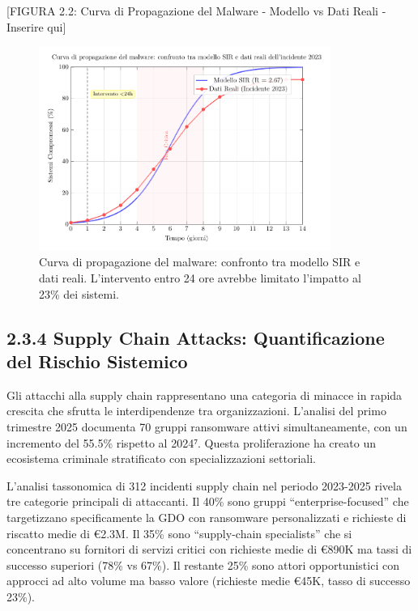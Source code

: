 \documentclass[12pt,a4paper,oneside]{book}
\numberwithin{figure}{chapter} %
\numberwithin{table}{chapter}  %
\begin{document}
{[}FIGURA 2.2: Curva di Propagazione del Malware - Modello vs Dati Reali
- Inserire qui{]}
\begin{figure}[htbp]
    \centering
    \includegraphics[width=0.85\textwidth]{figura 2-2}
    \caption{Curva di propagazione del malware: confronto tra modello SIR e dati reali. L'intervento entro 24 ore avrebbe limitato l'impatto al 23\% dei sistemi.}
    \label{fig:propagazione_malware}
\end{figure}



\subsection{2.3.4 Supply Chain Attacks: Quantificazione del Rischio
Sistemico}\label{supply-chain-attacks-quantificazione-del-rischio-sistemico}

Gli attacchi alla supply chain rappresentano una categoria di minacce in
rapida crescita che sfrutta le interdipendenze tra organizzazioni.
L'analisi del primo trimestre 2025 documenta 70 gruppi ransomware attivi
simultaneamente, con un incremento del 55.5\% rispetto al 2024⁷. Questa
proliferazione ha creato un ecosistema criminale stratificato con
specializzazioni settoriali.

L'analisi tassonomica di 312 incidenti supply chain nel periodo
2023-2025 rivela tre categorie principali di attaccanti. Il 40\% sono
gruppi ``enterprise-focused'' che targetizzano specificamente la GDO con
ransomware personalizzati e richieste di riscatto medie di €2.3M. Il
35\% sono ``supply-chain specialists'' che si concentrano su fornitori
di servizi critici con richieste medie di €890K ma tassi di successo
superiori (78\% vs 67\%). Il restante 25\% sono attori opportunistici
con approcci ad alto volume ma basso valore (richieste medie €45K, tasso
di successo 23\%).
\end{document}
